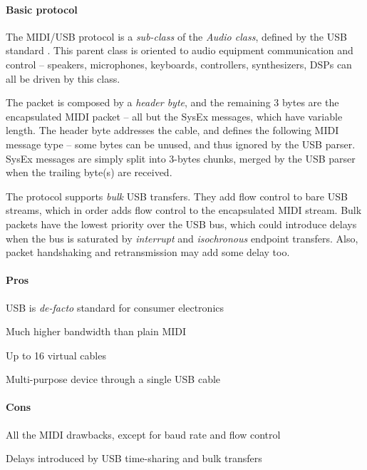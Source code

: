 \documentclass[a4paper,10pt]{article}
\begin{document}
\begin{multicols}{2}
\paragraph{Basic protocol}
The MIDI/USB protocol is a \emph{sub-class} of the \emph{Audio class}, defined
by the USB standard \cite{usb_docs}. This parent class is oriented to audio
equipment communication and control -- speakers, microphones, keyboards,
controllers, synthesizers, DSPs can all be driven by this class.

The packet is composed by a \emph{header byte}, and the remaining 3 bytes are
the encapsulated MIDI packet -- all but the SysEx messages, which have variable
length. The header byte addresses the cable, and defines the following MIDI
message type -- some bytes can be unused, and thus ignored by the USB parser.
SysEx messages are simply split into 3-bytes chunks, merged by the USB parser
when the trailing byte(s) are received.

The protocol supports \emph{bulk} USB transfers. They add flow control to bare
USB streams, which in order adds flow control to the encapsulated MIDI stream.
Bulk packets have the lowest priority over the USB bus, which could introduce
delays when the bus is saturated by \emph{interrupt} and \emph{isochronous}
endpoint transfers. Also, packet handshaking and retransmission may add
some delay too.


\paragraph{Pros}
\begin{itemize*}
	\item USB is \emph{de-facto} standard for consumer electronics
	\item Much higher bandwidth than plain MIDI
	\item Up to 16 virtual cables
	\item Multi-purpose device through a single USB cable
\end{itemize*}


\paragraph{Cons}
\begin{itemize*}
	\item All the MIDI drawbacks, except for baud rate and flow control
	\item Delays introduced by USB time-sharing and bulk transfers
\end{itemize*}



\end{multicols}
\end{document}
